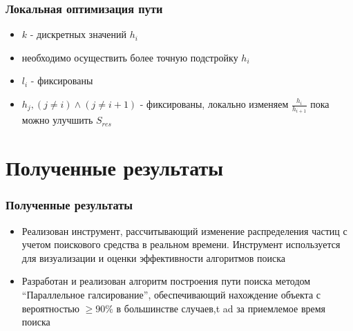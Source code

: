 \documentclass{beamer} %
\theoremstyle{definition} %
\begin{document}
\begin{frame}
\frametitle{Локальная оптимизация пути}
\begin{itemize}
\item{$k$ - дискретных значений $h_i$}
\item{необходимо осуществить более точную подстройку $h_i$}
\item{$l_i$ - фиксированы}
\item{$h_j, (j \neq i) \land (j \neq i+1)$ - фиксированы, локально изменяем $\frac{h_i}{h_{i+1}}$ пока можно улучшить $S_{res}$}
\end{itemize}
\end{frame}

\section{Полученные результаты}
\begin{frame}
\frametitle{Полученные результаты}
\begin{itemize}
\item{Реализован инструмент, рассчитывающий изменение распределения частиц с учетом поискового средства в реальном времени. Инструмент используется для визуализации и оценки эффективности алгоритмов поиска}
\item{Разработан и реализован алгоритм построения пути поиска методом ``Параллельное галсирование'', обеспечивающий нахождение объекта с вероятностью $\ge 90\%$ в большинстве случаев,t ad за приемлемое время поиска}
\end{itemize}
\end{frame}
\end{document}
